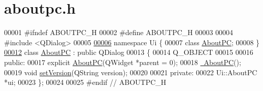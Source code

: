\hypertarget{aboutpc_8h_source}{\section{aboutpc.\-h}
}

\begin{DoxyCode}
00001 \textcolor{preprocessor}{#ifndef ABOUTPC\_H}
00002 \textcolor{preprocessor}{}\textcolor{preprocessor}{#define ABOUTPC\_H}
00003 \textcolor{preprocessor}{}
00004 \textcolor{preprocessor}{#include <QDialog>}
00005 
\hypertarget{aboutpc_8h_source_l00006}{}\hyperlink{namespace_ui}{00006} \textcolor{keyword}{namespace }Ui \{
00007 \textcolor{keyword}{class }\hyperlink{class_about_p_c}{AboutPC};
00008 \}
\hypertarget{aboutpc_8h_source_l00012}{}\hyperlink{class_about_p_c}{00012} \textcolor{keyword}{class }\hyperlink{class_about_p_c}{AboutPC} : \textcolor{keyword}{public} QDialog
00013 \{
00014     Q\_OBJECT
00015 
00016 \textcolor{keyword}{public}:
00017     \textcolor{keyword}{explicit} \hyperlink{class_about_p_c_a89341c4427d97da60acf15dc929ad8a6}{AboutPC}(QWidget *parent = 0);
00018     \hyperlink{class_about_p_c_a3cc0c4c81abc640d946003b078a47dd4}{~AboutPC}();
00019     \textcolor{keywordtype}{void} \hyperlink{class_about_p_c_aa3815d4826d0c8d87122449537a0a4d5}{setVersion}(QString version);
00020 
00021 \textcolor{keyword}{private}:
00022     Ui::AboutPC *ui;
00023 \};
00024 
00025 \textcolor{preprocessor}{#endif // ABOUTPC\_H}
\end{DoxyCode}
